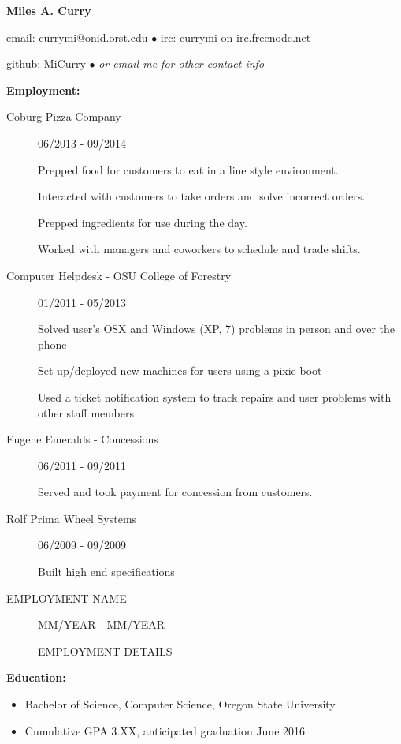 \documentclass[11pt]{article}
\begin{document}
\centerline{{\LARGE \bf Miles A. Curry}}

\bigskip

\centerline{email: currymi@onid.orst.edu
        $\bullet$
        irc: currymi on irc.freenode.net}
\centerline{github: MiCurry
        $\bullet$
        \emph{or email me for other contact info}}

\bigskip
\hrulefill
\bigskip

{\Large \bf Employment:}
\begin{description}

\item[Coburg Pizza Company]
    \hfill 06/2013 - 09/2014

    Prepped food for customers to eat in a line style environment.

    Interacted with customers to take orders and solve incorrect orders.

    Prepped ingredients for use during the day.

    Worked with managers and coworkers to schedule and trade shifts.

\item[Computer Helpdesk - OSU College of Forestry]
    \hfill 01/2011 - 05/2013

    Solved user's OSX and Windows (XP, 7) problems in person and over the phone

    Set up/deployed new machines for users using a pixie boot

    Used a ticket notification system to track repairs and user problems
    with other staff members


\item[Eugene Emeralds - Concessions]
    \hfill 06/2011 - 09/2011

    Served and took payment for concession from customers.

\item[Rolf Prima Wheel Systems]
    \hfill 06/2009 - 09/2009

    Built high end specifications

\item[EMPLOYMENT NAME]
    \hfill MM/YEAR - MM/YEAR
       
     EMPLOYMENT DETAILS

\end{description}

\smallskip
\hrulefill
\bigskip

{\Large \bf Education:}
\begin{itemize}
    \setlength{\itemsep}{1pt}
    \setlength{\parskip}{0pt}
    \setlength{\parsep}{0pt}

    \item Bachelor of Science, Computer Science, Oregon State University
    \item Cumulative GPA 3.XX, anticipated graduation June 2016

\end{itemize}
\end{document}
